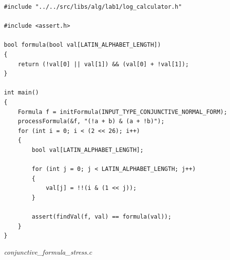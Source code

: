 \documentclass[a4paper,14pt]{extarticle}
\begin{document}
\begin{verbatim}
#include "../../src/libs/alg/lab1/log_calculator.h"

#include <assert.h>

bool formula(bool val[LATIN_ALPHABET_LENGTH])
{
    return (!val[0] || val[1]) && (val[0] + !val[1]);
}

int main()
{
    Formula f = initFormula(INPUT_TYPE_CONJUNCTIVE_NORMAL_FORM);
    processFormula(&f, "(!a + b) & (a + !b)");
    for (int i = 0; i < (2 << 26); i++)
    {
        bool val[LATIN_ALPHABET_LENGTH];

        for (int j = 0; j < LATIN_ALPHABET_LENGTH; j++)
        {
            val[j] = !!(i & (1 << j));
        }

        assert(findVal(f, val) == formula(val));
    }
}
\end{verbatim}
\newpage
\textit{conjunctive\_formula\_stress.c}
\end{document}
